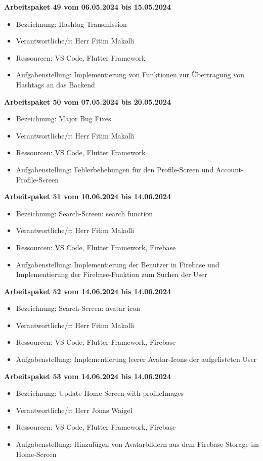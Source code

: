 \newpage
\textbf{Arbeitspaket 49 vom 06.05.2024 bis 15.05.2024}
\begin{itemize}[itemsep=0pt]
    \item{Bezeichnung: Hashtag Transmission} 
	\item{Verantwortliche/r: Herr Fitim Makolli} 
	\item{Ressourcen: VS Code, Flutter Framework} 
    \item{Aufgabenstellung: Implementierung von Funktionen zur Übertragung von Hashtags an das Backend}
\end{itemize} 

\textbf{Arbeitspaket 50 vom 07.05.2024 bis 20.05.2024}
\begin{itemize}[itemsep=0pt]
    \item{Bezeichnung: Major Bug Fixes} 
	\item{Verantwortliche/r: Herr Fitim Makolli} 
	\item{Ressourcen: VS Code, Flutter Framework} 
    \item{Aufgabenstellung: Fehlerbehebungen für den Profile-Screen und Account-Profile-Screen}
\end{itemize} 

\textbf{Arbeitspaket 51 vom 10.06.2024 bis 14.06.2024}
\begin{itemize}[itemsep=0pt]
    \item{Bezeichnung: Search-Screen: search function} 
	\item{Verantwortliche/r: Herr Fitim Makolli} 
	\item{Ressourcen: VS Code, Flutter Framework, Firebase} 
    \item{Aufgabenstellung: Implementierung der Benutzer in Firebase und Implementierung der Firebase-Funktion zum Suchen der User}
\end{itemize} 

\textbf{Arbeitspaket 52 vom 14.06.2024 bis 14.06.2024}
\begin{itemize}[itemsep=0pt]
    \item{Bezeichnung: Search-Screen: avatar icon} 
	\item{Verantwortliche/r: Herr Fitim Makolli} 
	\item{Ressourcen: VS Code, Flutter Framework, Firebase} 
    \item{Aufgabenstellung: Implementierung leerer Avatar-Icons der aufgelisteten User}
\end{itemize} 

\textbf{Arbeitspaket 53 vom 14.06.2024 bis 14.06.2024}
\begin{itemize}[itemsep=0pt]
    \item{Bezeichnung: Update Home-Screen with profileImages} 
	\item{Verantwortliche/r: Herr Jonas Waigel} 
	\item{Ressourcen: VS Code, Flutter Framework, Firebase} 
    \item{Aufgabenstellung: Hinzufügen von Avatarbildern aus dem Firebase Storage im Home-Screen}
\end{itemize}

